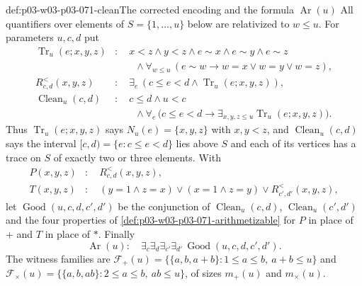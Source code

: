 \begin{hbdefinition}{def:p03-w03-p03-071-clean}{The corrected encoding and the formula \(\operatorname{Ar}(u)\)}
All quantifiers over elements of \(S=\{1,\ldots,u\}\) below are relativized
to \(w\leq u\).  For parameters \(u,c,d\) put
\begin{align*}
  \operatorname{Tr}_u(e;x,y,z)&:\quad x<z\wedge y<z\wedge e\sim x\wedge e\sim y
     \wedge e\sim z\\
  &\qquad\wedge\forall_{w\leq u}\,(e\sim w\to w=x\vee w=y\vee w=z),\\
  R^<_{c,d}(x,y,z)&:\quad \exists_e\,(c\leq e<d\wedge
     \operatorname{Tr}_u(e;x,y,z)),\\
  \operatorname{Clean}_u(c,d)&:\quad c\leq d\wedge u<c\\
  &\qquad\wedge\forall_e\,\bigl(c\leq e<d\to\exists_{x,y,z\leq u}
     \operatorname{Tr}_u(e;x,y,z)\bigr).
\end{align*}
Thus \(\operatorname{Tr}_u(e;x,y,z)\) says \(N_u(e)=\{x,y,z\}\) with
\(x,y<z\), and \(\operatorname{Clean}_u(c,d)\) says the interval
\([c,d)=\{e:c\leq e<d\}\) lies above \(S\) and each of its vertices has a
trace on \(S\) of exactly two or three elements.  With
\begin{align*}
  P(x,y,z)&:\quad R^<_{c,d}(x,y,z),\\
  T(x,y,z)&:\quad (y=1\wedge z=x)\vee(x=1\wedge z=y)\vee R^<_{c',d'}(x,y,z),
\end{align*}
let \(\operatorname{Good}(u,c,d,c',d')\) be the conjunction of
\(\operatorname{Clean}_u(c,d)\), \(\operatorname{Clean}_u(c',d')\) and the
four properties of \cref{def:p03-w03-p03-071-arithmetizable} for \(P\) in
place of \(+\) and \(T\) in place of \(\ast\).  Finally
\[
  \operatorname{Ar}(u):\quad\exists_c\exists_d\exists_{c'}\exists_{d'}\,
  \operatorname{Good}(u,c,d,c',d').
\]
The witness families are
\(\mathcal F_+(u)=\bigl\{\{a,b,a+b\}:1\leq a\leq b,\ a+b\leq u\bigr\}\) and
\(\mathcal F_\times(u)=\bigl\{\{a,b,ab\}:2\leq a\leq b,\ ab\leq u\bigr\}\), of
sizes \(m_+(u)\) and \(m_\times(u)\).
\end{hbdefinition}

